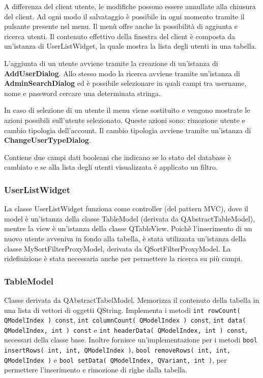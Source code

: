 \documentclass[a4paper,10pt]{article}
\begin{document}
A differenza del client utente, le modifiche possono essere annullate alla chiusura del client. Ad ogni modo il salvataggio è possibile in ogni momento tramite il pulsante presente nel menu. Il menù offre anche la possibilità di aggiunta e ricerca utenti. Il contenuto effettivo della finestra del client è composta da un'istanza di UserListWidget, la quale mostra la lista degli utenti in una tabella.

L'aggiunta di un utente avviene tramite la creazione di un'istanza di \textbf{AddUserDialog}. Allo stesso modo la ricerca avviene tramite un'istanza di \textbf{AdminSearchDialog} ed è possibile selezionare in quali campi tra username, nome e password cercare una determinata stringa.

In caso di selezione di un utente il menu viene sostituito e vengono mostrate le azioni possibili sull'utente selezionato. Queste azioni sono: rimozione utente e cambio tipologia dell'account. Il cambio tipologia avviene tramite un'istanza di \textbf{ChangeUserTypeDialog}.

Contiene due campi dati booleani che indicano se lo stato del database è cambiato e se alla lista degli utenti visualizzata è applicato un filtro.

\subsubsection*{UserListWidget}
La classe UserListWidget funziona come controller (del pattern MVC), dove il model è un'istanza della classe TableModel (derivata da QAbstractTableModel), mentre la view è un'istanza della classe QTableView. Poichè l'inserimento di un nuovo utente avveniva in fondo alla tabella, è stata utilizzata un'istanza della classe MySortFilterProxyModel, derivata da QSortFilterProxyModel. La ridefinizione è stata necessaria anche per permettere la ricerca su più campi.

\subsubsection*{TableModel}
Classe derivata da QAbstractTabelModel. Memorizza il contenuto della tabella in una lista di vettori di oggetti QString. Implementa i metodi \texttt{int rowCount( QModelIndex ) const}, \texttt{int columnCount( QModelIndex ) const}, \texttt{int data( QModelIndex, int ) const} e \texttt{int headerData( QModelIndex, int ) const}, necessari della classe base. Inoltre fornisce un'implementazione per i metodi \texttt{bool insertRows( int, int, QModelIndex )}, \texttt{bool removeRows( int, int, QModelIndex )} e \texttt{bool setData( QModelIndex, QVariant, int )}, per permettere l'inserimento e rimozione di righe dalla tabella.
\end{document}
